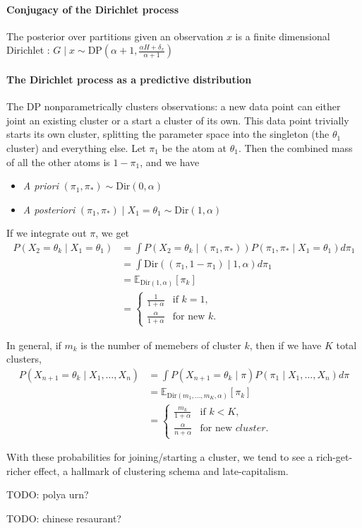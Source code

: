 \documentclass[twoside]{article}
\newcommand{\Dir}{\mathrm{Dir}}
\newcommand{\DP}{\mathrm{DP}}
\newcommand{\todo}[1]{{\color{red} TODO: #1}}
\begin{document}
\paragraph{Conjugacy of the Dirichlet process}
The posterior over partitions given an observation $x$ is a finite dimensional Dirichlet :
$ G \mid x \sim \DP(\alpha+1, \frac{\alpha H + \delta_x}{\alpha + 1})$

\paragraph{The Dirichlet process as a predictive distribution}

The DP nonparametrically clusters observations: a new data point can either joint an existing cluster or a start a cluster of its own.  This data point trivially starts its own cluster, splitting the parameter space into the singleton (the $\theta_1$ cluster) and everything else.  Let $\pi_1$ be the atom at $\theta_1$.  Then the combined mass of all the other atoms is $1 - \pi_1$, and we have
\begin{itemize}
\item \emph{A priori} $(\pi_1,\pi_*) \sim \Dir(0,\alpha)$
\item \emph{A posteriori} $(\pi_1,\pi_*) \mid X_1 = \theta_1 \sim \Dir(1,\alpha)$
\end{itemize}

If we integrate out $\pi$, we get
\begin{align*}
   P(X_2 = \theta_k \mid X_1 = \theta_1)
&= \int P(X_2 = \theta_k \mid (\pi_1,\pi_*)) P(\pi_1,\pi_* \mid X_1=\theta_1) d\pi_1  \\
&= \int \Dir((\pi_1,1-\pi_1) \mid 1,\alpha) d\pi_1 \\
&= \mathbb{E}_{\Dir(1,\alpha)}[\pi_k] \\
&= \begin{cases}
    \frac{1}{1+\alpha} & \text{if } k=1,\\
    \frac{\alpha}{1+\alpha} & \text{for new } k.
\end{cases}
\end{align*}

In general, if $m_k$ is the number of memebers of cluster $k$, then if we have $K$ total clusters,
\begin{align*}
   P(X_{n+1} = \theta_k \mid X_1,\ldots,X_n)
&= \int P(X_{n+1} = \theta_k \mid \pi) P(\pi_1 \mid X_1,\ldots,X_n) d\pi  \\
&= \mathbb{E}_{\Dir(m_1,\ldots,m_K,\alpha)}[\pi_k] \\
&= \begin{cases}
    \frac{m_k}{1+\alpha} & \text{if } k<K,\\
    \frac{\alpha}{n+\alpha} & \text{for new } cluster.
\end{cases}
\end{align*}

With these probabilities for joining/starting a cluster, we tend to see a rich-get-richer effect, a hallmark of clustering schema and late-capitalism.

\todo{polya urn?}

\todo{chinese resaurant?}
\end{document}
